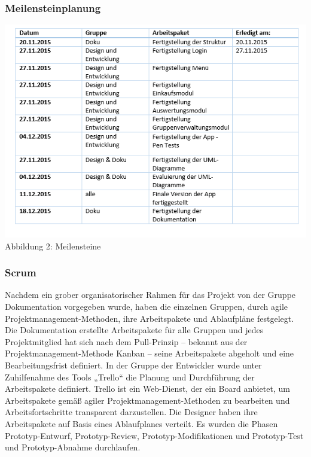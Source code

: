 \documentclass[12pt,a4paper]{article}
\begin{document}
\subsubsection*{Meilensteinplanung}
\includegraphics[scale=0.6, origin=l]{Meilensteine.png}
\\
\footnotesize Abbildung 2: Meilensteine
\normalsize


\subsubsection{Scrum}
Nachdem ein grober organisatorischer Rahmen für das Projekt von der Gruppe Dokumentation vorgegeben wurde, haben die einzelnen Gruppen, durch agile Projektmanagement-Methoden,  ihre Arbeitspakete und Ablaufpläne festgelegt. 
Die Dokumentation erstellte Arbeitspakete für alle Gruppen und jedes Projektmitglied hat sich nach dem Pull-Prinzip – bekannt aus der Projektmanagement-Methode Kanban – seine Arbeitspakete abgeholt und eine Bearbeitungsfrist definiert. 
In der Gruppe der Entwickler wurde unter Zuhilfenahme des Tools „Trello“ die Planung und Durchführung der Arbeitspakete definiert. Trello ist ein Web-Dienst, der ein Board anbietet, um Arbeitspakete gemäß agiler Projektmanagement-Methoden zu bearbeiten und Arbeitsfortschritte transparent darzustellen. 
Die Designer haben ihre Arbeitspakete auf Basis eines Ablaufplanes verteilt. Es wurden die Phasen Prototyp-Entwurf, Prototyp-Review, Prototyp-Modifikationen und Prototyp-Test und Prototyp-Abnahme durchlaufen.
\newpage
\end{document}
